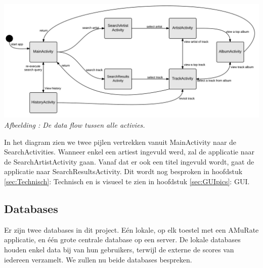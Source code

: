 \documentclass[11pt,a4paper]{article}
\newcounter{figc}
\newcommand{\increaseFigID} {%
   \stepcounter{figc}%
   \thefigc}
\newcommand{\figID}[1]{\small \textit{Afbeelding \increaseFigID : #1} \\ \normalsize}
\begin{document}
	\hspace{-3em} \includegraphics[scale=0.14]{Pictures/Dataflow4.png} \newline
	\figID{De data flow tussen alle activies.} 
	
	In het diagram zien we twee pijlen vertrekken vanuit MainActivity naar de SearchActivities. Wanneer enkel een artiest ingevuld werd, zal de applicatie naar de SearchArtistActivity gaan. Vanaf dat er ook een titel ingevuld wordt, gaat de applicatie naar SearchResultsActivity. Dit wordt nog besproken in hoofdstuk \ref{sec:Technisch}: Technisch  en is visueel te zien in hoofdstuk \ref{sec:GUIpics}: GUI.
	
	\subsection{Databases}
	\label{sec:Databases}
	Er zijn twee databases in dit project. Eén lokale, op elk toestel met een AMuRate applicatie, en één grote centrale database op een server. De lokale databases houden enkel data bij van hun gebruikers, terwijl de externe de scores van iedereen verzamelt. We zullen nu beide databases bespreken.
	
\end{document}
